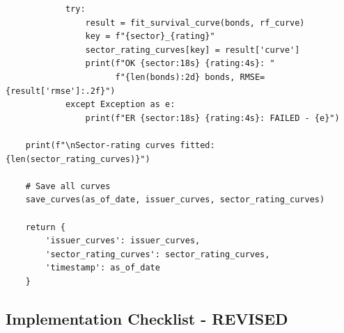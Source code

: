 \documentclass[11pt,a4paper]{article}
\begin{document}
\begin{implbox}
\begin{lstlisting}
            try:
                result = fit_survival_curve(bonds, rf_curve)
                key = f"{sector}_{rating}"
                sector_rating_curves[key] = result['curve']
                print(f"OK {sector:18s} {rating:4s}: "
                      f"{len(bonds):2d} bonds, RMSE={result['rmse']:.2f}")
            except Exception as e:
                print(f"ER {sector:18s} {rating:4s}: FAILED - {e}")
    
    print(f"\nSector-rating curves fitted: {len(sector_rating_curves)}")
    
    # Save all curves
    save_curves(as_of_date, issuer_curves, sector_rating_curves)
    
    return {
        'issuer_curves': issuer_curves,
        'sector_rating_curves': sector_rating_curves,
        'timestamp': as_of_date
    }
\end{lstlisting}
\end{implbox}

\subsection{Implementation Checklist - REVISED}
\end{document}
